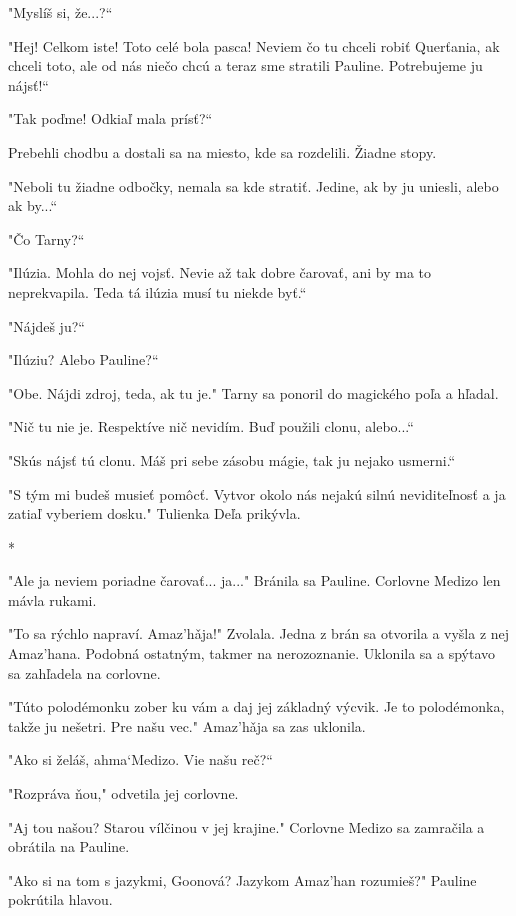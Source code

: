 \documentclass{book}
\begin{document}
"$ $Myslíš si, že...?“

"$ $Hej! Celkom iste! Toto celé bola pasca! Neviem čo tu chceli robiť Querťania, ak chceli toto, ale od nás niečo chcú a teraz sme stratili Pauline. Potrebujeme ju nájsť!“

"$ $Tak poďme! Odkiaľ mala prísť?“

Prebehli chodbu a dostali sa na miesto, kde sa rozdelili. Žiadne stopy.

"$ $Neboli tu žiadne odbočky, nemala sa kde stratiť. Jedine, ak by ju uniesli, alebo ak by...“

"$ $Čo Tarny?“

"$ $Ilúzia. Mohla do nej vojsť. Nevie až tak dobre čarovať, ani by ma to neprekvapila. Teda tá ilúzia musí tu niekde byť.“

"$ $Nájdeš ju?“

"$ $Ilúziu? Alebo Pauline?“

"$ $Obe. Nájdi zdroj, teda, ak tu je."$ $ Tarny sa ponoril do magického poľa a hľadal.

"$ $Nič tu nie je. Respektíve nič nevidím. Buď použili clonu, alebo...“

"$ $Skús nájsť tú clonu. Máš pri sebe zásobu mágie, tak ju nejako usmerni.“

"$ $S tým mi budeš musieť pomôcť. Vytvor okolo nás nejakú silnú neviditeľnosť a ja zatiaľ vyberiem dosku."$ $ Tulienka Deľa prikývla.

\begin{center}
*
\end{center}

"$ $Ale ja neviem poriadne čarovať... ja..."$ $ Bránila sa Pauline. Corlovne Medizo len mávla rukami.

"$ $To sa rýchlo napraví. Amaz'ha\v{}ja!"$ $ Zvolala. Jedna z brán sa otvorila a vyšla z nej Amaz'hana. Podobná ostatným, takmer na nerozoznanie. Uklonila sa a spýtavo sa zahľadela na corlovne.

"$ $Túto polodémonku zober ku vám a daj jej základný výcvik. Je to polodémonka, takže ju nešetri. Pre našu vec."$ $ Amaz'ha\v{}ja sa zas uklonila.

"$ $Ako si želáš, ahma‘Medizo. Vie našu reč?“

"$ $Rozpráva ňou,"$ $ odvetila jej corlovne.

"$ $Aj tou našou? Starou vílčinou v jej krajine."$ $ Corlovne Medizo sa zamračila a obrátila na Pauline.

"$ $Ako si na tom s jazykmi, Goonová? Jazykom Amaz'han rozumieš?"$ $ Pauline pokrútila hlavou.
\end{document}

